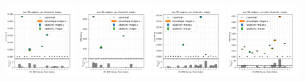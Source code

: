 \begin{figure}
    \includegraphics[width=0.24\textwidth]{chapters/Appendix/sectionTTSyst/figures/afterCorr/icata1_ch0_meps.png}
    \includegraphics[width=0.24\textwidth]{chapters/Appendix/sectionTTSyst/figures/afterCorr/icata1_ch1_meps.png}
    \includegraphics[width=0.24\textwidth]{chapters/Appendix/sectionTTSyst/figures/afterCorr/icata1_ch2_meps.png}
    \includegraphics[width=0.24\textwidth]{chapters/Appendix/sectionTTSyst/figures/afterCorr/icata1_ch3_meps.png}
    

\end{figure}
